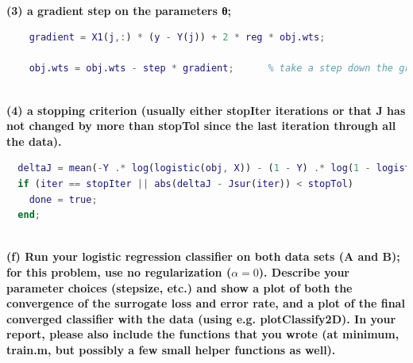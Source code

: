 \documentclass[]{report}   %
\begin{document}
~\\
{\bf (3) a gradient step on the parameters θ;}
\begin{lstlisting}[language=Matlab, caption=Compute gradient.]
    % Compute gradient:
    gradient = X1(j,:) * (y - Y(j)) + 2 * reg * obj.wts;

    obj.wts = obj.wts - step * gradient;      % take a step down the gradient
\end{lstlisting}
~\\
{\bf (4) a stopping criterion (usually either stopIter iterations or that J has not changed by more than stopTol since the last iteration through all the data).}
\begin{lstlisting}[language=Matlab, caption=Implement stopping criterion.]
  %   done = false;
  deltaJ = mean(-Y .* log(logistic(obj, X)) - (1 - Y) .* log(1 - logistic(obj, X)) + reg * obj.wts * obj.wts');  
  if (iter == stopIter || abs(deltaJ - Jsur(iter)) < stopTol)
    done = true;
  end;
\end{lstlisting}
~\\
{\bf (f) Run your logistic regression classifier on both data sets (A and B); for this problem, use no regularization ($\alpha = 0$). Describe your parameter choices (stepsize, etc.) and show a plot of both the convergence of the surrogate loss and error rate, and a plot of the final converged classifier with the data (using e.g. plotClassify2D). In your report, please also include the functions that you wrote (at minimum, train.m, but possibly a few small helper functions as well).}
\end{document}
